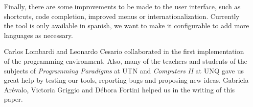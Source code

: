\documentclass{sigplanconf}
\begin{document}
Finally, there are some improvements to be made to the user interface, such as shortcuts, code completion, improved menus or internationalization. Currently the tool is only available in spanish, we want to make it configurable to add more languages as necessary.

\acks

Carlos Lombardi and Leonardo Cesario collaborated in the first implementation of the programming environment. Also, many of the teachers and students of the subjects of \textit{Programming Paradigms} at UTN and \textit{Computers II} at UNQ gave us great help by testing our tools, reporting bugs and proposing new ideas. Gabriela Arévalo, Victoria Griggio and Débora Fortini helped us in the writing of this paper.

\nocite{Libe11,Mich00,Kouz07,Shan06,Shch95}


%
\end{document}
